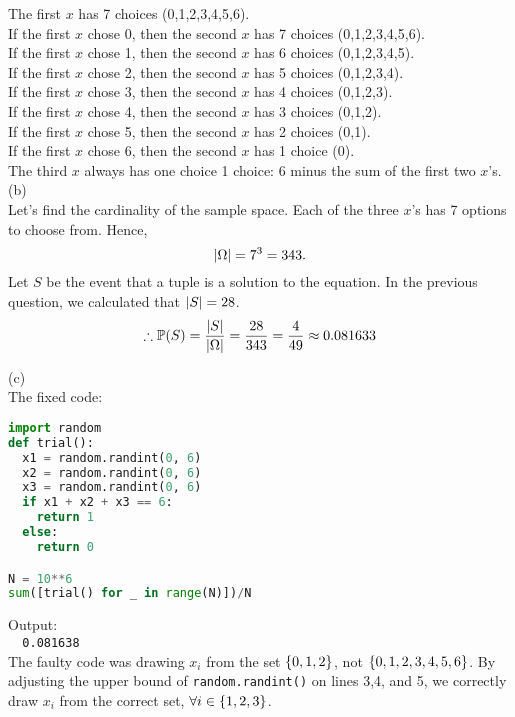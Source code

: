 \documentclass[a4paper,12pt]{report}
\begin{document}
The first $x$ has 7 choices (0,1,2,3,4,5,6). \\
If the first $x$ chose 0, then the second $x$ has 7 choices (0,1,2,3,4,5,6). \\
If the first $x$ chose 1, then the second $x$ has 6 choices (0,1,2,3,4,5). \\
If the first $x$ chose 2, then the second $x$ has 5 choices (0,1,2,3,4). \\
If the first $x$ chose 3, then the second $x$ has 4 choices (0,1,2,3). \\
If the first $x$ chose 4, then the second $x$ has 3 choices (0,1,2). \\
If the first $x$ chose 5, then the second $x$ has 2 choices (0,1). \\
If the first $x$ chose 6, then the second $x$ has 1 choice (0). \\
The third $x$ always has one choice 1 choice: 6 minus the sum of the first two $x$'s. \\

\newpage
\sol (b) \\
Let's find the cardinality of the sample space. Each of the three $x$'s has 7 options to choose from. Hence,
$$
  \left| \Omega \right| = 7^3 = 343.
$$
Let $S$ be the event that a tuple is a solution to the equation. In the previous question, we calculated that $\left| S \right|=28$.
$$
  \therefore\mathbb{P}(S) = \frac{\left| S \right|}{\left| \Omega \right|} = \frac{28}{343} = \frac{4}{49} \approx 0.081633
$$

\sol (c) \\
The fixed code:
\begin{lstlisting}[language=Python]
import random
def trial():
  x1 = random.randint(0, 6)
  x2 = random.randint(0, 6)
  x3 = random.randint(0, 6)
  if x1 + x2 + x3 == 6:
    return 1
  else:
    return 0

N = 10**6
sum([trial() for _ in range(N)])/N
\end{lstlisting}
Output: \\
\verb|  0.081638| \\

The faulty code was drawing $x_i$ from the set $\left\lbrace 0,1,2 \right\rbrace$, not $\left\lbrace 0,1,2,3,4,5,6 \right\rbrace$. By adjusting the upper bound of \verb|random.randint()| on lines 3,4, and 5, we correctly draw $x_i$ from the correct set, $\forall i\in\left\lbrace 1,2,3 \right\rbrace$.
\end{document}
